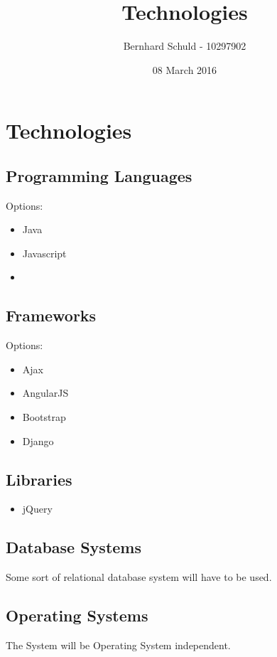 \documentclass[12pt, letterpaper, twoside]{article}
\title{Technologies}
\author{Bernhard Schuld - 10297902}
\date{08 March 2016}
\begin{document}
\section{Technologies}

	\subsection{Programming Languages}
		Options:
		\begin{itemize}
			\item Java
			\item Javascript
			\item 
		\end{itemize}
	\subsection{Frameworks}
		Options:
		\begin{itemize}
			\item Ajax
			\item AngularJS
			\item Bootstrap
			\item Django
		\end{itemize}

	\subsection{Libraries}
		\begin{itemize}	
			\item jQuery
		\end{itemize}
	
	\subsection{Database Systems}
		Some sort of relational database system will have to be used.
	\subsection{Operating Systems}
		The System will be Operating System independent.
\end{document}
